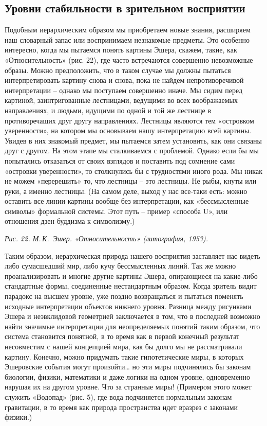 \documentclass[../main.tex]{subfiles}
\begin{document}
\subsection{Уровни стабильности в зрительном восприятии}

Подобным иерархическим образом мы приобретаем новые знания, расширяем наш словарный запас или воспринимаем незнакомые предметы. Это особенно интересно, когда мы пытаемся понять картины Эшера, скажем, такие, как «Относительность» (рис. 22), где часто встречаются совершенно невозможные образы. Можно предположить, что в таком случае мы должны пытаться интерпретировать картину снова и снова, пока не найдем непротиворечивой интерпретации \--- однако мы поступаем совершенно иначе. Мы сидим перед картиной, заинтригованные лестницами, ведущими во всех воображаемых направлениях, и людьми, идущими по одной и той же лестнице в противоречащих друг другу направлениях. Лестницы являются тем «островком уверенности», на котором мы основываем нашу интерпретацию всей картины. Увидев в них знакомый предмет, мы пытаемся затем установить, как они связаны друг с другом. На этом этапе мы сталкиваемся с проблемой. Однако если бы мы попытались отказаться от своих взглядов и поставить под сомнение сами «островки уверенности», то столкнулись бы с трудностями иного рода. Мы никак не можем «перерешить» то, что лестницы \--- это лестницы. Не рыбы, кнуты или руки, а именно лестницы. (На самом деле, выход у нас все-таки есть: можно оставить все линии картины вообще без интерпретации, как «бессмысленные символы» формальной системы. Этот путь \--- пример «способа U», или отношения дзен-буддизма к символизму.)

\emph{Рис. 22. М.\,К.~Эшер. «Относительность» (литография, 1953).}

Таким образом, иерархическая природа нашего восприятия заставляет нас видеть либо сумасшедший мир, либо кучу бессмысленных линий. Так же можно проанализировать и многие другие картины Эшера, опирающиеся на какие-либо стандартные формы, соединенные нестандартным образом. Когда зритель видит парадокс на высшем уровне, уже поздно возвращаться и пытаться поменять исходные интерпретации объектов нижнего уровня. Разница между рисунками Эшера и неэвклидовой геометрией заключается в том, что в последней возможно найти значимые интерпретации для неопределяемых понятий таким образом, что система становится понятной, в то время как в первой конечный результат несовместим с нашей концепцией мира, как бы долго мы не рассматривали картину. Конечно, можно придумать такие гипотетические миры, в которых Эшеровские события могут произойти\ldots{} но эти миры подчинялись бы законам биологии, физики, математики и даже логики на одном уровне, одновременно нарушая их на другом уровне. Что за странные миры! (Примером этого может служить «Водопад» (рис. 5), где вода подчиняется нормальным законам гравитации, в то время как природа пространства идет вразрез с законами физики.)
\end{document}
